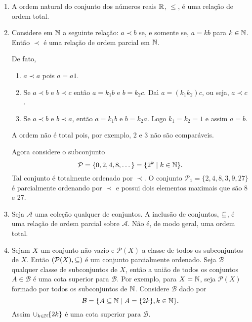 \begin{exemplo}
	\begin{enumerate}
		\item A ordem natural do conjunto dos n\'umeros reais $\mathbb{R}$, $\le$, \'e uma rela\c{c}\~ao de ordem total.
		\item Considere em $\mathbb{N}$ a seguinte rela\c{c}\~ao: $a \prec b$ se, e somente se, $a = kb$ para $k \in \mathbb{N}$. Ent\~ao $\prec$ \'e uma rela\c{c}\~ao de ordem parcial em $\mathbb{N}$.
		\begin{solucao}
			De fato,
			\begin{enumerate}
				\item $a \prec a$ pois $a = a1$.
				\item Se $a \prec b$ e $b \prec c$ ent\~ao $a = k_1b$ e $b = k_2 c$. Da{\'\i} $a = (k_1k_2)c$, ou seja, $a \prec c$.
				\item Se $a \prec b$ e $b \prec a$, ent\~ao $a = k_1b$ e $b = k_2a$. Logo $k_1 = k_2 = 1$ e assim $a = b$.
			\end{enumerate}
			A ordem n\~ao \'e total pois, por exemplo, 2 e 3 n\~ao s\~ao compar\'aveis.

			Agora considere o subconjunto
			\[
				\mathcal{P} = \{0,2,4,8,\dots\} = \{2^k \mid k \in \mathbb{N}\}.
			\]
			Tal conjunto \'e totalmente ordenado por $\prec$. O conjunto $\mathcal{P}_1 = \{2,4,8,3,9,27\}$ \'e parcialmente ordenando por $\prec$ e possui dois elementos maximais que s\~ao 8 e 27.
		\end{solucao}
		\item Seja $\mathcal{A}$ uma cole\c{c}\~ao qualquer de conjuntos. A inclus\~ao de conjuntos, $\subseteq$, \'e uma rela\c{c}\~ao de ordem parcial sobre $\mathcal{A}$. N\~ao \'e, de modo geral, uma ordem total.
		\item Sejam $X$ um conjunto n\~ao vazio e $\mathcal{P}(X)$ a classe de todos os subconjuntos de $X$. Ent\~ao $(\mathcal{P}(X),\subseteq)$ \'e um conjunto parcialmente ordenado. Seja $\mathcal{B}$ qualquer classe de subconjuntos de $X$, ent\~ao a uni\~ao de todos os conjuntos $A \in \mathcal{B}$ \'e uma cota superior para $\mathcal{B}$. Por exemplo, para $X = \mathbb{N}$, seja $\mathcal{P}(X)$ formado por todos os subconjuntos de $\mathbb{N}$. Considere $\mathcal{B}$ dado por
		\[
			\mathcal{B} = \{A\subseteq \mathbb{N} \mid A = \{2k\}, k \in \mathbb{N}\}.
		\]
		Assim $\cup_{k \in \mathbb{N}}\{2k\}$ \'e uma cota superior para $\mathcal{B}$.
	\end{enumerate}
\end{exemplo}

